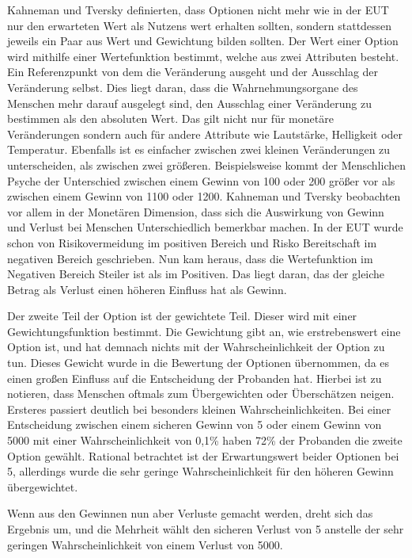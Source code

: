 Kahneman und Tversky definierten, dass Optionen nicht mehr wie in der EUT nur den erwarteten Wert als Nutzens wert erhalten sollten, sondern stattdessen jeweils ein Paar aus Wert und Gewichtung bilden sollten.
Der Wert einer Option wird mithilfe einer Wertefunktion bestimmt, welche aus zwei Attributen besteht. Ein Referenzpunkt von dem die Veränderung ausgeht und der Ausschlag der Veränderung selbst. Dies liegt daran, dass die Wahrnehmungsorgane des Menschen mehr darauf ausgelegt sind, den Ausschlag einer Veränderung zu bestimmen als den absoluten Wert. Das gilt nicht nur für monetäre Veränderungen sondern auch für andere Attribute wie Lautstärke, Helligkeit oder Temperatur. Ebenfalls ist es einfacher zwischen zwei kleinen Veränderungen zu unterscheiden, als zwischen zwei größeren. Beispielsweise kommt der Menschlichen Psyche der Unterschied zwischen einem Gewinn von 100 oder 200 größer vor als zwischen einem Gewinn von 1100 oder 1200. \parencite[S.278]{Kahneman.2013} Kahneman und Tversky beobachten vor allem in der Monetären Dimension, dass sich die Auswirkung von Gewinn und Verlust bei Menschen Unterschiedlich bemerkbar machen. In der EUT wurde schon von Risikovermeidung im positiven Bereich und Risko Bereitschaft im negativen Bereich geschrieben. Nun kam heraus, dass die Wertefunktion im Negativen Bereich Steiler ist als im Positiven. Das liegt daran, das der gleiche Betrag als Verlust einen höheren Einfluss hat als Gewinn.

Der zweite Teil der Option ist der gewichtete Teil. Dieser wird mit einer Gewichtungsfunktion bestimmt. Die Gewichtung gibt an, wie erstrebenswert eine Option ist, und hat demnach nichts mit der Wahrscheinlichkeit der Option zu tun. Dieses Gewicht wurde in die Bewertung der Optionen übernommen, da es einen großen Einfluss auf die Entscheidung der Probanden hat. Hierbei ist zu notieren, dass Menschen oftmals zum Übergewichten oder Überschätzen neigen. Ersteres passiert deutlich bei besonders kleinen Wahrscheinlichkeiten. Bei einer Entscheidung zwischen einem sicheren Gewinn von 5 oder einem Gewinn von 5000 mit einer Wahrscheinlichkeit von 0,1\% haben 72\% der Probanden die zweite Option gewählt. \parencite[S. 154]{Markowitz.1952} Rational betrachtet ist der Erwartungswert beider Optionen bei 5, allerdings wurde die sehr geringe Wahrscheinlichkeit für den höheren Gewinn übergewichtet. 

Wenn aus den Gewinnen nun aber Verluste gemacht werden, dreht sich das Ergebnis um, und die Mehrheit wählt den sicheren Verlust von 5 anstelle der sehr geringen Wahrscheinlichkeit von einem Verlust von 5000.

